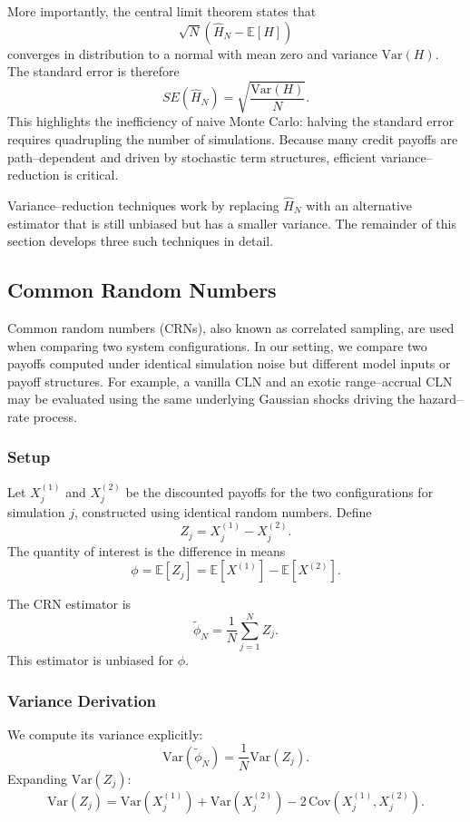 More importantly, the central limit theorem states that
\[
\sqrt{N}(\hat{H}_N - \mathbb{E}[H])
\]
converges in distribution to a normal with mean zero and variance
$\mathrm{Var}(H)$. The standard error is therefore
\[
SE(\hat{H}_N) = \sqrt{\frac{\mathrm{Var}(H)}{N}}.
\]
This highlights the inefficiency of naive Monte Carlo: halving the standard
error requires quadrupling the number of simulations. Because many credit
payoffs are path--dependent and driven by stochastic term structures,
efficient variance--reduction is critical.

Variance--reduction techniques work by replacing $\hat{H}_N$ with an
alternative estimator that is still unbiased but has a smaller variance. The
remainder of this section develops three such techniques in detail.

\subsection{Common Random Numbers}

Common random numbers (CRNs), also known as correlated sampling, are used when
comparing two system configurations. In our setting, we compare two payoffs
computed under identical simulation noise but different model inputs or payoff
structures. For example, a vanilla CLN and an exotic range--accrual CLN may be
evaluated using the same underlying Gaussian shocks driving the hazard--rate
process.

\subsubsection*{Setup}

Let $X_j^{(1)}$ and $X_j^{(2)}$ be the discounted payoffs for the two
configurations for simulation $j$, constructed using identical random numbers.
Define
\[
Z_j = X_j^{(1)} - X_j^{(2)}.
\]
The quantity of interest is the difference in means
\[
\phi = \mathbb{E}[Z_j] = \mathbb{E}[X^{(1)}] - \mathbb{E}[X^{(2)}].
\]

The CRN estimator is
\[
\tilde{\phi}_N = \frac{1}{N}\sum_{j=1}^N Z_j.
\]
This estimator is unbiased for $\phi$.

\subsubsection*{Variance Derivation}

We compute its variance explicitly:
\[
\mathrm{Var}(\tilde{\phi}_N)
= \frac{1}{N} \mathrm{Var}(Z_j).
\]
Expanding $\mathrm{Var}(Z_j)$:
\[
\mathrm{Var}(Z_j)
= \mathrm{Var}(X_j^{(1)}) + \mathrm{Var}(X_j^{(2)})
- 2\,\mathrm{Cov}(X_j^{(1)}, X_j^{(2)}).
\]

